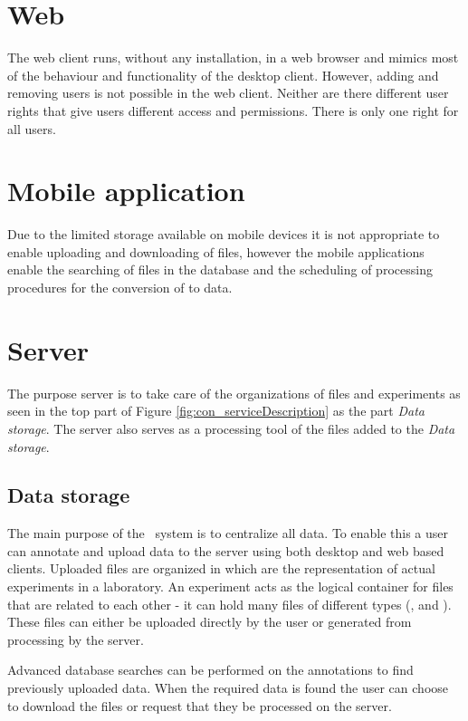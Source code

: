 \section{Web}
The web client runs, without any installation, in a web browser and mimics most of the behaviour and functionality of the desktop client. However, adding and removing users is not possible in the web client. Neither are there different user rights that give users different access and permissions. There is only one right for all users.

\section{Mobile application}
Due to the limited storage available on mobile devices it is not appropriate to enable uploading and downloading of files, however the mobile applications enable the searching of files in the database and the scheduling of processing procedures for the conversion of  to  data.

\section{Server}
The purpose server is to take care of the organizations of files and experiments as seen in the top part of Figure \ref{fig:con_serviceDescription} as the part \textit{Data storage}. The server also serves as a processing tool of the files added to the \textit{Data storage}. 

\subsection{Data storage}
The main purpose of the \appName\ system is to centralize all data. To enable this a user can annotate and upload data to the server using both desktop and web based clients. Uploaded files are organized in  which are the representation of actual experiments in a laboratory. An experiment acts as the logical container for files that are related to each other - it can hold many files of different types (,  and ). These files can either be uploaded directly by the user or generated from processing by the server.

Advanced database searches can be performed on the annotations to find previously uploaded data. When the required data is found the user can choose to download the files or request that they be processed on the server. 


